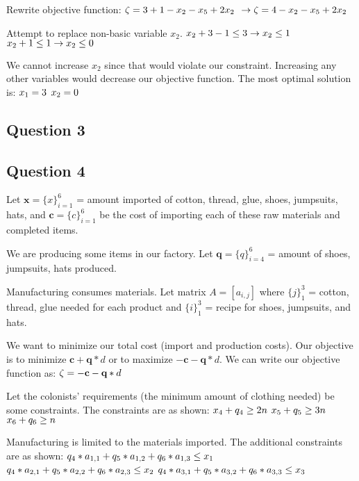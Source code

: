 \documentclass[17pt]{extarticle}
\begin{document}
Rewrite objective function:
$\\\zeta = 3 + 1 - x_2 - x_5 + 2x_2$
$\\\to \zeta = 4 - x_2 - x_5 + 2x_2$

Attempt to replace non-basic variable $x_2$.
$\\ x_2 + 3 - 1 \leq 3 \to x_2 \leq 1$
$\\ x_2 + 1 \leq 1 \to x_2 \leq 0$

We cannot increase $x_2$ since that would violate our constraint. Increasing any other variables would decrease our objective function. The most optimal solution is:
$\\x_1 = 3$
$\\x_2 = 0$


\newpage
\subsection*{Question 3}

\newpage
\subsection*{Question 4}
Let $\textbf{x} = \{x\}_{i=1}^6$ = amount imported of cotton, thread, glue, shoes, jumpsuits, hats, and $\textbf{c} = \{c\}_{i=1}^6$ be the cost of importing each of these raw materials and completed items.

We are producing some items in our factory. Let $\textbf{q} = \{q\}_{i=4}^6$ = amount of shoes, jumpsuits, hats produced.

Manufacturing consumes materials. Let matrix $A = [a_{i,j}]$ where $\{j\}_1^3$ = cotton, thread, glue needed for each product and $\{i\}_1^3$ = recipe for shoes, jumpsuits, and hats.

We want to minimize our total cost (import and production costs). Our objective is to minimize $\textbf{c}+\textbf{q}*d$ or to maximize $-\textbf{c}-\textbf{q}*d$. We can write our objective function as:
$\\\zeta = -\textbf{c}-\textbf{q}*d$

Let the colonists' requirements (the minimum amount of clothing needed) be some constraints. The constraints are as shown:
$\\x_4 + q_4 \geq 2n$
$\\x_5 + q_5 \geq 3n$
$\\x_6 + q_6 \geq n$

Manufacturing is limited to the materials imported. The additional constraints are as shown:
$\\q_4*a_{1,1} + q_5*a_{1,2} + q_6*a_{1,3} \leq x_1$
$\\q_4*a_{2,1} + q_5*a_{2,2} + q_6*a_{2,3} \leq x_2$
$\\q_4*a_{3,1} + q_5*a_{3,2} + q_6*a_{3,3} \leq x_3$
\end{document}
